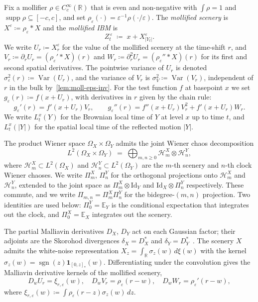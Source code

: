 \documentclass[EJP]{ejpecp}
\newcommand{\R}{\mathbb{R}}
\renewcommand{\E}{\mathbb{E}}
\newcommand{\Hilb}{\mathcal{H}}
\newcommand{\IBM}{Z}
\newcommand{\Pir}{\Pi}
\DeclareMathOperator{\Var}{Var}
\DeclareMathOperator{\supp}{supp}
\DeclareMathOperator{\sgn}{sgn}
\begin{document}
Fix a mollifier $\rho\in C_c^\infty(\R)$ that is even and
non-negative with $\int\rho=1$ and $\supp\rho\subseteq[-c,c]$, and
set $\rho_\varepsilon(\cdot)=\varepsilon^{-1}\rho(\cdot/\varepsilon)$.
The \emph{mollified scenery} is $X^\varepsilon\coloneqq\rho_\varepsilon*X$
and the \emph{mollified IBM} is
\begin{equation}\label{eq:moll-scenery}
  \IBM_t^{\,\varepsilon}\;\coloneqq\;x+X^\varepsilon_{|Y_t|}.
\end{equation}
We write $U_r\coloneqq X^\varepsilon_r$ for the value of the
mollified scenery at the time-shift $r$, and
$V_r\coloneqq\partial_r U_r=(\rho_\varepsilon'*X)(r)$ and
$W_r\coloneqq\partial_r^2 U_r=(\rho_\varepsilon''*X)(r)$ for its
first and second spatial derivatives. The pointwise variance of
$U_r$ is denoted $\sigma_\varepsilon^2(r)\coloneqq\Var(U_r)$, and
the variance of $V_r$ is $\sigma_V^2\coloneqq\Var(V_r)$, independent
of $r$ in the bulk by~\cref{lem:moll-eps-inv}. For the test
function $f$ at basepoint $x$ we set
$g_\varepsilon(r)\coloneqq f(x+U_r)$, with derivatives in $r$ given
by the chain rule:
\begin{equation}\label{eq:gprime}
  g_\varepsilon'(r)=f'(x+U_r)V_r,
  \qquad
  g_\varepsilon''(r)=f''(x+U_r)V_r^{2}+f'(x+U_r)W_r.
\end{equation}
We write $L_t^x(Y)$ for the Brownian local time of $Y$ at level $x$
up to time $t$, and $L_t^x(|Y|)$ for the spatial local time of the
reflected motion $|Y|$.

The product Wiener space $\Omega_X\times\Omega_Y$ admits the joint
Wiener chaos decomposition
\begin{equation}\label{eq:joint-chaos}
  L^{2}(\Omega_X\times\Omega_Y)
  \;=\;\bigoplus_{m,n\ge 0}\Hilb_m^X\otimes\Hilb_n^Y,
\end{equation}
where $\Hilb_m^X\subset L^2(\Omega_X)$ and
$\Hilb_n^Y\subset L^2(\Omega_Y)$ are the $m$-th scenery and $n$-th
clock Wiener chaoses. We write $\Pir_m^X$, $\Pir_n^Y$ for the
orthogonal projections onto $\Hilb_m^X$ and $\Hilb_n^Y$, extended
to the joint space as $\Pir_m^X\otimes\mathrm{Id}_Y$ and
$\mathrm{Id}_X\otimes\Pir_n^Y$ respectively. These commute, and we
write $\Pir_{m,n}=\Pir_m^X\Pir_n^Y$ for the bidegree-$(m,n)$
projection. Two identities are used below: $\Pir_0^Y=\E_Y$ is the
conditional expectation that integrates out the clock, and
$\Pir_0^X=\E_X$ integrates out the scenery.

The partial Malliavin derivatives $D_X$, $D_Y$ act on each Gaussian
factor; their adjoints are the Skorohod divergences $\delta_X=D_X^*$
and $\delta_Y=D_Y^*$~\cite{Nualart,Janson}. The scenery $X$ admits
the white-noise representation $X_z=\int_\R\sigma_z(w)\,d\xi(w)$
with the kernel
$\sigma_z(w)=\sgn(z)\mathbf 1_{[0,z]_*}(w)$. Differentiating under
the convolution gives the Malliavin derivative kernels of the
mollified scenery,
\begin{equation}\label{eq:Dw}
  D_w U_r=\xi_{r,\varepsilon}(w),
  \quad
  D_w V_r=\rho_{\varepsilon}(r-w),
  \quad
  D_w W_r=\rho_{\varepsilon}'(r-w),
\end{equation}
where $\xi_{r,\varepsilon}(w)\coloneqq\int\rho_\varepsilon(r-z)\sigma_z(w)\,dz$.
\end{document}

